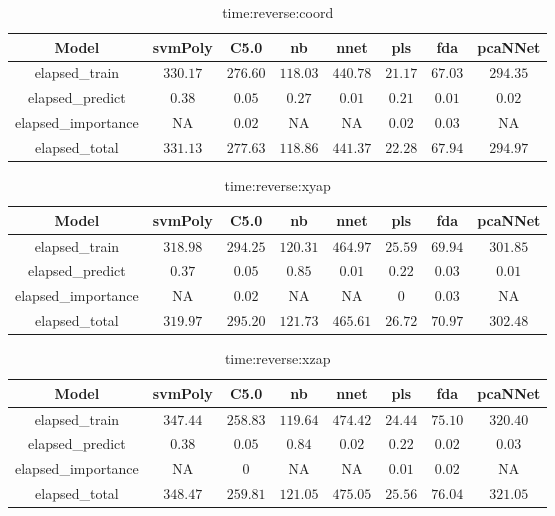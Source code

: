 \begin{table}[!ht]
	\centering
	\begin{tabular}{|c|c|c|c|c|c|c|c|}
		\hline
		Model & svmPoly & C5.0 & nb & nnet & pls & fda & pcaNNet \\ \hline
		elapsed_train & $330.17$ & $276.60$ & $118.03$ & $440.78$ & $21.17$ & $67.03$ & $294.35$ \\ \hline
		elapsed_predict & $0.38$ & $0.05$ & $0.27$ & $0.01$ & $0.21$ & $0.01$ & $0.02$ \\ \hline
		elapsed_importance & NA & $0.02$ & NA & NA & $0.02$ & $0.03$ & NA \\ \hline
		elapsed_total & $331.13$ & $277.63$ & $118.86$ & $441.37$ & $22.28$ & $67.94$ & $294.97$ \\ \hline
	\end{tabular}
	\caption{time:reverse:coord}
	\label{tab:time:reverse:coord}
\end{table}

\begin{table}[!ht]
	\centering
	\begin{tabular}{|c|c|c|c|c|c|c|c|}
		\hline
		Model & svmPoly & C5.0 & nb & nnet & pls & fda & pcaNNet \\ \hline
		elapsed_train & $318.98$ & $294.25$ & $120.31$ & $464.97$ & $25.59$ & $69.94$ & $301.85$ \\ \hline
		elapsed_predict & $0.37$ & $0.05$ & $0.85$ & $0.01$ & $0.22$ & $0.03$ & $0.01$ \\ \hline
		elapsed_importance & NA & $0.02$ & NA & NA & $0$ & $0.03$ & NA \\ \hline
		elapsed_total & $319.97$ & $295.20$ & $121.73$ & $465.61$ & $26.72$ & $70.97$ & $302.48$ \\ \hline
	\end{tabular}
	\caption{time:reverse:xyap}
	\label{tab:time:reverse:xyap}
\end{table}

\begin{table}[!ht]
	\centering
	\begin{tabular}{|c|c|c|c|c|c|c|c|}
		\hline
		Model & svmPoly & C5.0 & nb & nnet & pls & fda & pcaNNet \\ \hline
		elapsed_train & $347.44$ & $258.83$ & $119.64$ & $474.42$ & $24.44$ & $75.10$ & $320.40$ \\ \hline
		elapsed_predict & $0.38$ & $0.05$ & $0.84$ & $0.02$ & $0.22$ & $0.02$ & $0.03$ \\ \hline
		elapsed_importance & NA & $0$ & NA & NA & $0.01$ & $0.02$ & NA \\ \hline
		elapsed_total & $348.47$ & $259.81$ & $121.05$ & $475.05$ & $25.56$ & $76.04$ & $321.05$ \\ \hline
	\end{tabular}
	\caption{time:reverse:xzap}
	\label{tab:time:reverse:xzap}
\end{table}

